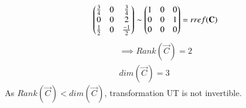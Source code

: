 \documentclass[journal,12pt,twocolumn]{IEEEtran}
\begin{document}
\begin{enumerate}
\begin{align}
\begin{pmatrix}\frac{3}{4}&0&\frac{3}{4}\\0&0&2\\\frac{1}{2}&0&\frac{-1}{2}\end{pmatrix} \sim \begin{pmatrix}1&0&0\\0&0&1\\0&0&0\end{pmatrix}=rref(\mathbf{C})
\end{align}
\begin{align}
\implies Rank(\vec{C})=2 \label{RankC}\\
dim(\vec{C})=3
\end{align}
As $Rank(\vec{C})<dim(\vec{C})$, transformation UT is not invertible.
\end{enumerate}
\end{document}
